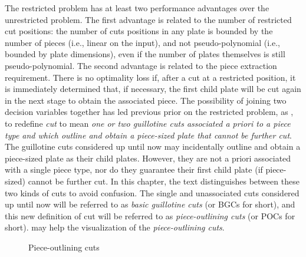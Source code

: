 \documentclass[ppgc,tese,english,formais,babel]{iiufrgs}
\begin{document}
The restricted problem has at least two performance advantages over the unrestricted problem.
The first advantage is related to the number of restricted cut positions: the number of cuts positions in any plate is bounded by the number of pieces (i.e., linear on the input), and not pseudo-polynomial (i.e., bounded by plate dimensions), even if the number of plates themselves is still pseudo-polynomial.
The second advantage is related to the piece extraction requirement.
There is no optimality loss if, after a cut at a restricted position, it is immediately determined that, if necessary, the first child plate will be cut again in the next stage to obtain the associated piece.
The possibility of joining two decision variables together has led previous prior on the restricted problem, as \cite{silva:2010}, to redefine \emph{cut} to mean \emph{one or two guillotine cuts associated a priori to a piece type and which outline and obtain a piece-sized plate that cannot be further cut}.
The guillotine cuts considered up until now may incidentally outline and obtain a piece-sized plate as their child plates.
However, they are not a priori associated with a single piece type, nor do they guarantee their first child plate (if piece-sized) cannot be further cut.
In this chapter, the text distinguishes between these two kinds of cuts to avoid confusion.
The single and unassociated cuts considered up until now will be referred to as \emph{basic guillotine cuts} (or BGCs for short), and this new definition of cut will be referred to as \emph{piece-outlining cuts} (or POCs for short).
 may help the visualization of the \emph{piece-outlining cuts}.

\begin{figure}[h]
  \caption{Piece-outlining cuts}
  \center
  
  \label{fig:piece_outlining_cut}
\end{figure}
\end{document}

